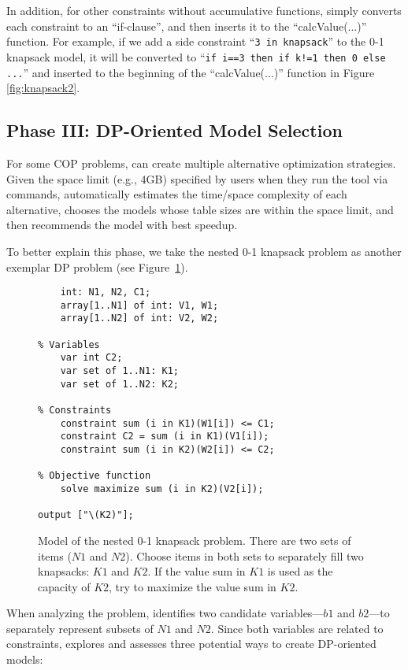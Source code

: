 In addition, for other constraints without accumulative functions, \tool simply converts each constraint to an ``if-clause'', and then inserts it to the ``calcValue(...)'' function. For example, if we add a side constraint ``\texttt{3 in knapsack}'' to the 0-1 knapsack model, it will be converted to ``\texttt{if i==3 then if k!=1 then 0 else ...}'' and inserted to the beginning of the ``calcValue(...)'' function in Figure \ref{fig:knapsack2}.
 
 
 \subsection{Phase III: DP-Oriented Model Selection}
 \label{sec:select}
 
 For some COP problems, \tool can create multiple alternative optimization strategies. Given the space limit (e.g., 4GB) specified by users when they run the tool via commands, \tool automatically estimates the time/space complexity of each alternative, chooses the models whose table sizes are within the space limit, and then recommends the model with best speedup.  
 
To better explain this phase, we take the nested 0-1 knapsack problem as another exemplar DP problem (see Figure~\ref{fig:knapsack3}).  
 	\begin{figure}[htb]
\begin{lstlisting}[frame=single]
% Input arguments
    int: N1, N2, C1;
    array[1..N1] of int: V1, W1;
    array[1..N2] of int: V2, W2;

% Variables
    var int C2;
    var set of 1..N1: K1;
    var set of 1..N2: K2;

% Constraints
    constraint sum (i in K1)(W1[i]) <= C1;
    constraint C2 = sum (i in K1)(V1[i]);
    constraint sum (i in K2)(W2[i]) <= C2;
    
% Objective function
    solve maximize sum (i in K2)(V2[i]);

output ["\(K2)"];
\end{lstlisting}
\caption{Model of the nested 0-1 knapsack problem. There are two sets of items ($N1$ and $N2$).
Choose items in both sets to separately fill two knapsacks: $K1$ and $K2$. If the value sum in $K1$ is used as the capacity of $K2$, try to maximize the value sum in $K2$.}\label{fig:knapsack3}
\end{figure}
When analyzing the problem, \tool identifies two candidate variables---$b1$ and $b2$---to separately represent subsets of $N1$ and $N2$.
Since both variables are related to constraints, \tool explores and assesses three potential ways to create DP-oriented models: 

